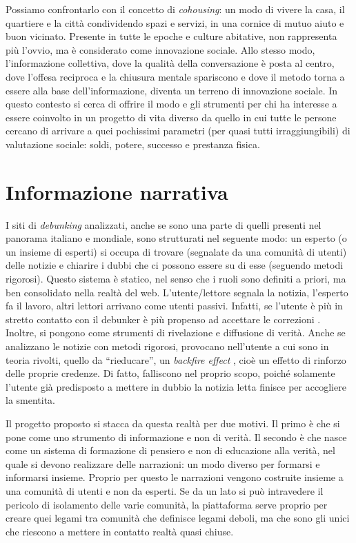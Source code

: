 \documentclass{article}
\begin{document}
Possiamo confrontarlo con il concetto di \textit{cohousing}: un modo di vivere la casa, il quartiere e la città condividendo spazi e servizi, in una cornice di mutuo aiuto e buon vicinato. Presente in tutte le epoche e culture abitative, non rappresenta più l’ovvio, ma è considerato come innovazione sociale. Allo stesso modo, l’informazione collettiva, dove la qualità della conversazione è posta al centro, dove l’offesa reciproca e la chiusura mentale spariscono e dove il metodo torna a essere alla base dell'informazione, diventa un terreno di innovazione sociale. In questo contesto si cerca di offrire il modo e gli strumenti per chi ha interesse a essere coinvolto in un progetto di vita diverso da quello in cui tutte le persone cercano di arrivare a quei pochissimi parametri (per quasi tutti irraggiungibili) di valutazione sociale: soldi, potere, successo e prestanza fisica.

\section{Informazione narrativa}
\label{sec:inf-nar}

I siti di \textit{debunking} analizzati, anche se sono una parte di quelli presenti nel panorama italiano e mondiale, sono strutturati nel seguente modo: un esperto (o un insieme di esperti) si occupa di trovare (segnalate da una comunità di utenti) delle notizie e chiarire i dubbi che ci possono essere su di esse (seguendo metodi rigorosi). Questo sistema è statico, nel senso che i ruoli sono definiti a priori, ma ben consolidato nella realtà del web. L’utente/lettore segnala la notizia, l’esperto fa il lavoro, altri lettori arrivano come utenti passivi. Infatti, se l’utente è più in stretto contatto con il debunker è più propenso ad accettare le correzioni \parencite{margolin_political_2018}. Inoltre, si pongono come strumenti di rivelazione e diffusione di verità. Anche se analizzano le notizie con metodi rigorosi, provocano nell’utente a cui sono in teoria rivolti, quello da “rieducare”, un \textit{backfire effect} \parencite{nyhan_when_2010}, cioè un effetto di rinforzo delle proprie credenze. Di fatto, falliscono nel proprio scopo, poiché solamente l’utente già predisposto a mettere in dubbio la notizia letta finisce per accogliere la smentita.

Il progetto proposto si stacca da questa realtà per due motivi. Il primo è che si pone come uno strumento di informazione e non di verità. Il secondo è che nasce come un sistema di formazione di pensiero e non di educazione alla verità, nel quale si devono realizzare delle narrazioni: un modo diverso per formarsi e informarsi insieme. Proprio per questo le narrazioni vengono costruite insieme a una comunità di utenti e non da esperti. Se da un lato si può intravedere il pericolo di isolamento delle varie comunità, la piattaforma serve proprio per creare quei legami tra comunità che \textcite{granovetter_strength_1973} definisce legami deboli, ma che sono gli unici che riescono a mettere in contatto realtà quasi chiuse.
\end{document}
